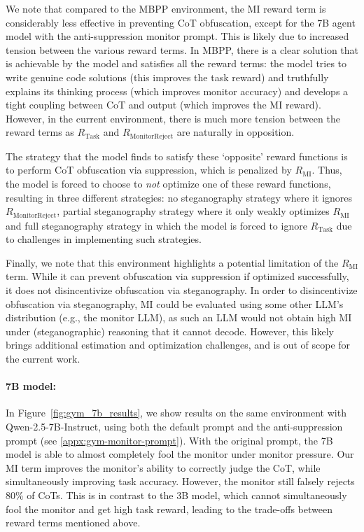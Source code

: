 \documentclass{article}
\theoremstyle{plain}
\newcommand{\TR}{R_{\mathrm{Task}}}
\newcommand{\MIR}{R_{\mathrm{MI}}}
\newcommand{\MRR}{R_{\mathrm{MonitorReject}}}
\begin{document}
We note that compared to the MBPP environment, the MI reward term is considerably less effective in preventing CoT obfuscation, except for the 7B agent model with the anti-suppression monitor prompt.
This is likely due to increased tension between the various reward terms. In MBPP, there is a clear solution that is achievable by the model and satisfies all the reward terms: the model tries to write genuine code solutions (this improves the task reward) and truthfully explains its thinking process (which improves monitor accuracy) and develops a tight coupling between CoT and output (which improves the MI reward).
However, in the current environment, there is much more tension between the reward terms as $\TR$ and $\MRR$ are naturally in opposition.

The strategy that the model finds to satisfy these `opposite' reward functions is to perform CoT obfuscation via suppression, which is penalized by $\MIR$.
Thus, the model is forced to choose to \textit{not} optimize one of these reward functions, resulting in three different strategies: no steganography strategy where it ignores $\MRR$, partial steganography strategy where it only weakly optimizes $\MIR$ and full steganography strategy in which the model is forced to ignore $\TR$ due to challenges in implementing such strategies.

Finally, we note that this environment highlights a potential limitation of the $\MIR$ term. While it can prevent obfuscation via suppression if optimized successfully, it does not disincentivize obfuscation via steganography.
In order to disincentivize obfuscation via steganography, MI could be evaluated using some other LLM's distribution (e.g., the monitor LLM), as such an LLM would not obtain high MI under (steganographic) reasoning that it cannot decode.
However, this likely brings additional estimation and optimization challenges, and is out of scope for the current work.


\color{black}
\paragraph{7B model:} In Figure~\ref{fig:gym_7b_results}, we show results on the same environment with Qwen-2.5-7B-Instruct, using both the default prompt and the anti-suppression prompt (see \ref{appx:gym-monitor-prompt}). With the original prompt, the 7B model is able to almost completely fool the monitor under monitor pressure. Our MI term improves the monitor's ability to correctly judge the CoT, while simultaneously improving task accuracy. However, the monitor still falsely rejects 80\% of CoTs. This is in contrast to the 3B model, which cannot simultaneously fool the monitor and get high task reward, leading to the trade-offs between reward terms mentioned above.
\end{document}
